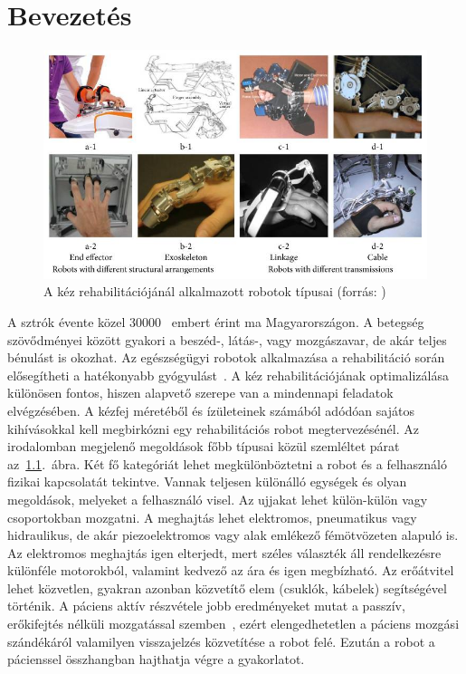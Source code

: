 \chapter{Bevezetés}

\begin{figure}[b!]
	\begin{center}
		\includegraphics[width=12cm]{images/hand_rehab_robot_types.jpeg}
		\caption[A kéz rehabilitációjánál alkalmazott robotok típusai ]{A kéz rehabilitációjánál alkalmazott robotok típusai (forrás: \cite{Yue2017})}\label{fig:hand_rehab_robot_types}
	\end{center}
\end{figure}

A sztrók évente közel 30\hspace{1.5pt}000~\citep{Bereczki2023} embert érint ma Magyarországon. A betegség szövődményei között gyakori 
a beszéd-, látás-, vagy mozgászavar, de akár teljes bénulást is okozhat. Az egészségügyi robotok alkalmazása a 
rehabilitáció során elősegítheti a hatékonyabb gyógyulást~\citep{Chang2013}. A kéz rehabilitációjának optimalizálása 
különösen fontos, hiszen alapvető szerepe van a mindennapi feladatok elvégzésében. A kézfej méretéből és ízületeinek számából 
adódóan sajátos kihívásokkal kell megbirkózni egy rehabilitációs robot megtervezésénél.
Az irodalomban megjelenő megoldások főbb típusai közül szemléltet párat az~\ref{fig:hand_rehab_robot_types}.~ábra.
Két fő kategóriát lehet megkülönböztetni a robot és a felhasználó fizikai kapcsolatát tekintve. Vannak teljesen 
különálló egységek és olyan megoldások, melyeket a felhasználó visel. Az ujjakat lehet külön-külön vagy 
csoportokban mozgatni. A meghajtás lehet elektromos, pneumatikus vagy hidraulikus, de akár piezoelektromos vagy 
alak emlékező fémötvözeten alapuló is. Az elektromos meghajtás igen elterjedt, mert széles választék áll rendelkezésre különféle motorokból, 
valamint kedvező az ára és igen megbízható. Az erőátvitel lehet közvetlen, gyakran azonban közvetítő elem (csuklók, kábelek) 
segítségével történik. A páciens aktív részvétele jobb eredményeket mutat a passzív, erőkifejtés nélküli mozgatással 
szemben~\citep{Remsik2016}, ezért elengedhetetlen a páciens mozgási szándékáról valamilyen visszajelzés közvetítése a robot felé.
Ezután a robot a pácienssel összhangban hajthatja végre a gyakorlatot.

